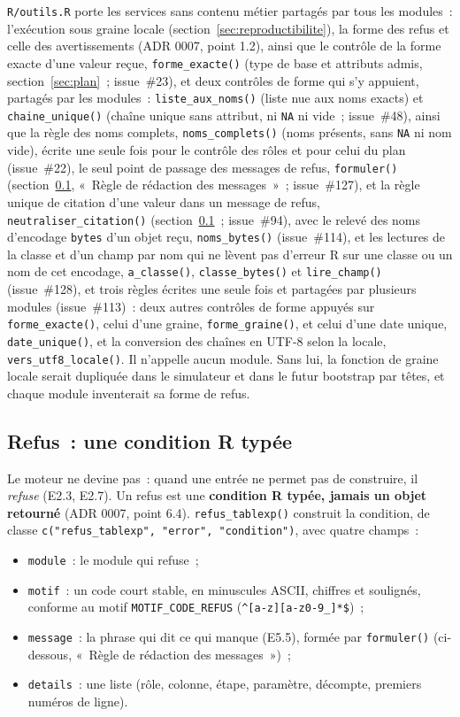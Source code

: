 \documentclass[a4paper,11pt]{article}
\newcommand{\code}[1]{\texttt{\small #1}}
\begin{document}
\code{R/outils.R} porte les services sans contenu métier partagés par tous les
modules~: l'exécution sous graine locale (section~\ref{sec:reproductibilite}),
la forme des refus et celle des avertissements (ADR 0007, point 1.2), ainsi
que le contrôle de la forme exacte d'une valeur reçue, \code{forme\_exacte()}
(type de base et attributs admis, section~\ref{sec:plan}~; issue~\#23), et
deux contrôles de forme qui s'y appuient, partagés par les modules~:
\code{liste\_aux\_noms()} (liste nue aux noms exacts) et
\code{chaine\_unique()} (chaîne unique sans attribut, ni \code{NA} ni vide~;
issue~\#48), ainsi que la règle des noms complets, \code{noms\_complets()}
(noms présents, sans \code{NA} ni nom vide), écrite une seule fois pour le
contrôle des rôles et pour celui du plan (issue~\#22), le seul point de
passage des messages de refus, \code{formuler()}
(section~\ref{sec:refus}, «~Règle de rédaction des messages~»~;
issue~\#127), et la règle unique de
citation d'une valeur dans un message de refus,
\code{neutraliser\_citation()} (section~\ref{sec:refus}~; issue~\#94),
avec le relevé des noms d'encodage \code{bytes} d'un objet reçu,
\code{noms\_bytes()} (issue~\#114), et les lectures de la classe et d'un
champ par nom qui ne lèvent pas d'erreur R sur une classe ou un nom de cet
encodage, \code{a\_classe()}, \code{classe\_bytes()} et
\code{lire\_champ()} (issue~\#128), et trois règles écrites une seule
fois et partagées par plusieurs modules (issue~\#113)~: deux autres
contrôles de forme appuyés sur \code{forme\_exacte()}, celui d'une graine,
\code{forme\_graine()}, et celui d'une date unique, \code{date\_unique()},
et la conversion des chaînes en UTF-8 selon la locale,
\code{vers\_utf8\_locale()}. Il n'appelle aucun module. Sans lui, la fonction de graine locale serait dupliquée
dans le simulateur et dans le futur bootstrap par têtes, et chaque module
inventerait sa forme de refus.

\subsection{Refus~: une condition R typée}
\label{sec:refus}

Le moteur ne devine pas~: quand une entrée ne permet pas de construire, il
\emph{refuse} (E2.3, E2.7). Un refus est une \textbf{condition R typée, jamais
un objet retourné} (ADR 0007, point 6.4). \code{refus\_tablexp()} construit la
condition, de classe \code{c("refus\_tablexp", "error", "condition")}, avec
quatre champs~:

\begin{itemize}[leftmargin=*, itemsep=2pt]
  \item \code{module}~: le module qui refuse~;
  \item \code{motif}~: un code court stable, en minuscules ASCII, chiffres et
    soulignés, conforme au motif \code{MOTIF\_CODE\_REFUS}
    (\verb|^[a-z][a-z0-9_]*$|)~;
  \item \code{message}~: la phrase qui dit ce qui manque (E5.5), formée par
    \code{formuler()} (ci-dessous, «~Règle de rédaction des messages~»)~;
  \item \code{details}~: une liste (rôle, colonne, étape, paramètre, décompte,
    premiers numéros de ligne).
\end{itemize}
\end{document}
